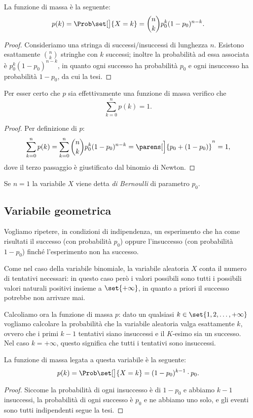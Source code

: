 La funzione di massa è la seguente: \[
    p(k) = \Prob\set[\big]{X = k} = \binom{n}{k}p_0^k(1-p_0)^{n-k}.
\] 
\begin{proof}
    Consideriamo una stringa di successi/insuccessi di lunghezza $n$. Esistono esattamente $\binom{n}{k}$ stringhe con $k$ successi; inoltre la probabilità ad essa associata è $p_0^k(1-p_0)^{n-k}$, in quanto ogni successo ha probabilità $p_0$ e ogni insuccesso ha probabilità $1-p_0$, da cui la tesi.
\end{proof}

Per esser certo che $p$ sia effettivamente una funzione di massa verifico che \[
    \sum_{k = 0}^n p(k) = 1.
\]
\begin{proof}
    Per definizione di $p$:
    \[
        \sum_{k = 0}^n p(k) = \sum_{k = 0}^n \binom{n}{k}p_0^k(1-p_0)^{n-k} = \parens[\Big]{p_0 + (1 - p_0)}^n = 1,
    \] dove il terzo passaggio è giustificato dal binomio di Newton.
\end{proof}

Se $n = 1$ la variabile $X$ viene detta \emph{di Bernoulli} di parametro $p_0$.

\subsection{Variabile geometrica}
Vogliamo ripetere, in condizioni di indipendenza, un esperimento che ha come risultati il successo (con probabilità $p_0$) oppure l'insuccesso (con probabilità $1 - p_0$) finché l'esperimento non ha successo. 

Come nel caso della variabile binomiale, la variabile aleatoria $X$ conta il numero di tentativi necessari: in questo caso però i valori possibili sono tutti i possibili valori naturali positivi insieme a $\set{+\infty}$, in quanto a priori il successo potrebbe non arrivare mai.

Calcoliamo ora la funzione di massa $p$: dato un qualsiasi $k \in \set{1, 2, \dots, +\infty}$ vogliamo calcolare la probabilità che la variabile aleatoria valga esattamente $k$, ovvero che i primi $k-1$ tentativi siano insuccessi e il $K$-esimo sia un successo. Nel caso $k = +\infty$, questo significa che tutti i tentativi sono insuccessi.

La funzione di massa legata a questa variabile è la seguente: \[
    p(k) = \Prob\set[\big]{X = k} = (1-p_0)^{k-1} \cdot p_0.
\]
\begin{proof}
    Siccome la probabilità di ogni insuccesso è di $1 - p_0$ e abbiamo $k-1$ insuccessi, la probabilità di ogni successo è $p_0$ e ne abbiamo uno solo, e gli eventi sono tutti indipendenti segue la tesi.
\end{proof}


